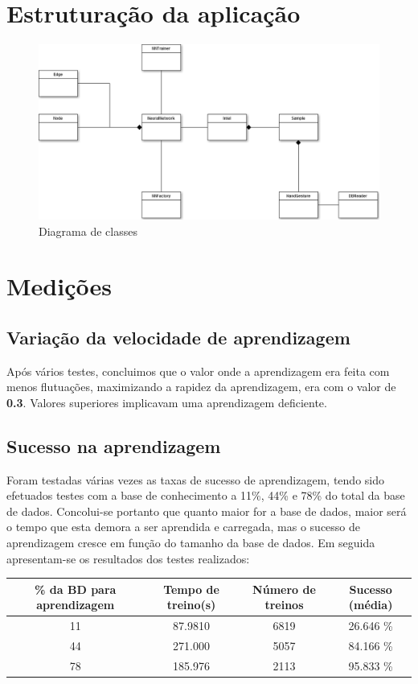 \documentclass[10pt,a4paper]{article}
\begin{document}
\section{Estruturação da aplicação}
\begin{figure}[here]
\centering
\includegraphics[scale=0.30]{iart_nn.png}
\caption{Diagrama de classes}
\end{figure}

\newpage
\section{Medições}

\subsection{Variação da velocidade de aprendizagem}

Após vários testes, concluimos que o valor onde a aprendizagem era feita com menos flutuações, maximizando a rapidez da aprendizagem, era com o valor de \textbf{0.3}. Valores superiores implicavam uma aprendizagem deficiente.

\subsection{Sucesso na aprendizagem}

Foram testadas várias vezes as taxas de sucesso de aprendizagem, tendo sido efetuados testes com a base de conhecimento a 11\%, 44\% e 78\% do total da base de dados. Concolui-se portanto que quanto maior for a base de dados, maior será o tempo que esta demora a ser aprendida e carregada, mas o sucesso de aprendizagem cresce em função do tamanho da base de dados. Em seguida apresentam-se os resultados dos testes realizados:

\begin{tabular}{|c|c|c|c|}
\hline 
\% da BD para aprendizagem & Tempo de treino(s)& Número de treinos & Sucesso (média)\\ 
\hline 
11 & 87.9810 & 6819 & 26.646 \% \\ 
44 & 271.000 & 5057 & 84.166 \% \\ 
78 & 185.976 & 2113 & 95.833 \% \\ 
\hline
\end{tabular} 
\end{document}
